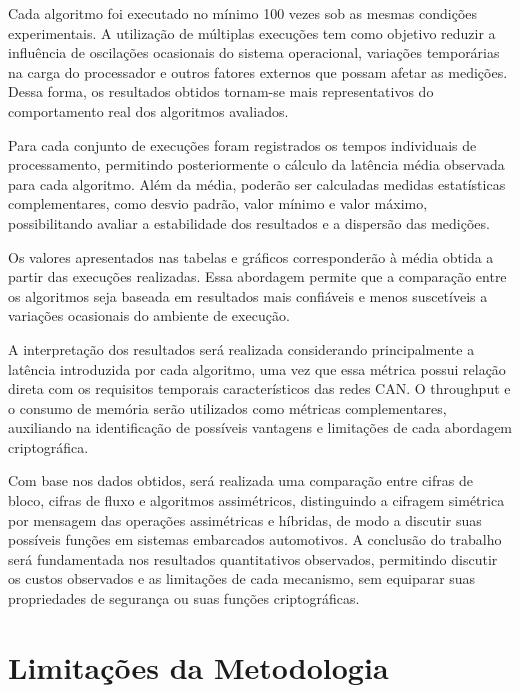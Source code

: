Cada algoritmo foi executado no mínimo 100 vezes sob as mesmas condições experimentais. A utilização de múltiplas execuções tem como objetivo reduzir a influência de oscilações ocasionais do sistema operacional, variações temporárias na carga do processador e outros fatores externos que possam afetar as medições. Dessa forma, os resultados obtidos tornam-se mais representativos do comportamento real dos algoritmos avaliados.



Para cada conjunto de execuções foram registrados os tempos individuais de processamento, permitindo posteriormente o cálculo da latência média observada para cada algoritmo. Além da média, poderão ser calculadas medidas estatísticas complementares, como desvio padrão, valor mínimo e valor máximo, possibilitando avaliar a estabilidade dos resultados e a dispersão das medições.



Os valores apresentados nas tabelas e gráficos corresponderão à média obtida a partir das execuções realizadas. Essa abordagem permite que a comparação entre os algoritmos seja baseada em resultados mais confiáveis e menos suscetíveis a variações ocasionais do ambiente de execução.



A interpretação dos resultados será realizada considerando principalmente a latência introduzida por cada algoritmo, uma vez que essa métrica possui relação direta com os requisitos temporais característicos das redes CAN. O throughput e o consumo de memória serão utilizados como métricas complementares, auxiliando na identificação de possíveis vantagens e limitações de cada abordagem criptográfica.



Com base nos dados obtidos, será realizada uma comparação entre cifras de bloco, cifras de fluxo e algoritmos assimétricos, distinguindo a cifragem simétrica por mensagem das operações assimétricas e híbridas, de modo a discutir suas possíveis funções em sistemas embarcados automotivos. A conclusão do trabalho será fundamentada nos resultados quantitativos observados, permitindo discutir os custos observados e as limitações de cada mecanismo, sem equiparar suas propriedades de segurança ou suas funções criptográficas.



\section{Limitações da Metodologia}



